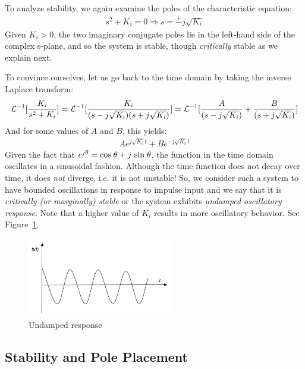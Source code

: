 \documentclass{article}
\def\L{{\cal L}}
\def\sn{{\rm sin}}
\def\cs{{\rm cos}}
\begin{document}
To analyze stability, we again examine the poles of the characteristic equation:
\begin{eqnarray*}
s^2 + K_i = 0  \Rightarrow s = \stackrel{+}{-} j \sqrt{K_i}
\end{eqnarray*}
Given $K_i > 0$, the two imaginary conjugate poles lie in the left-hand side of the complex s-plane,
and so the system is stable, though {\em critically} stable as we explain next.

To convince ourselves, let us go back to the time domain by taking the inverse Laplace transform:
\begin{eqnarray*}
\L^{-1}[\frac{K_i}{s^2 + K_i}] = \L^{-1}[\frac{K_i}{(s - j \sqrt{K_i})(s + j \sqrt{K_i})}] =
\L^{-1}[\frac{A}{(s - j \sqrt{K_i})} + \frac{B}{(s + j \sqrt{K_i})}] 
\end{eqnarray*}
And for some values of $A$ and $B$, this yields:
\begin{eqnarray*}
A e^{j \sqrt{K_i}t} + B e^{- j \sqrt{K_i}t}
\end{eqnarray*}
Given the fact that $e^{j \theta} =  \cs \; \theta + j \ \sn \; \theta$,
the function in the time domain oscillates in a sinusoidal fashion.
Although the time function does not decay over time,
it does {\em not} diverge, i.e. it is not unstable! 
So, we consider such a system to have bounded oscillations in response to
impulse input and we say that it is {\em critically (or marginally) stable} or 
the system exhibits  {\em undamped oscillatory response}.
Note that a higher value of $K_i$ results in more oscillatory behavior.
See Figure~\ref{fig:undamped}.

\begin{figure}[htbp] %
   \centering
   \includegraphics[width=2.5in]{figures/undamped.jpg} 
   \caption{Undamped response}
   \label{fig:undamped}
\end{figure}

\subsection{Stability and Pole Placement}
\end{document}
